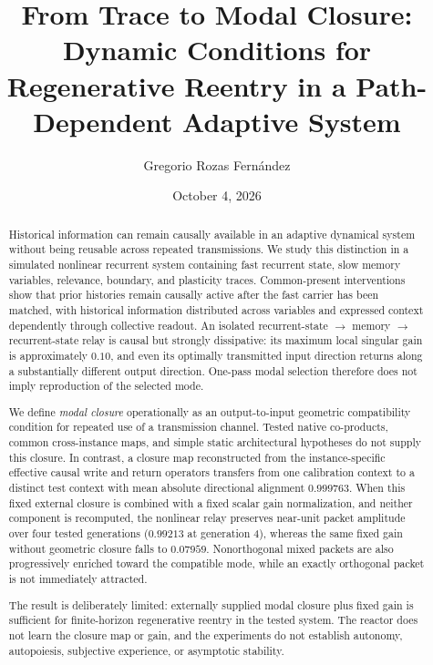 \documentclass[aps,pre,preprint,superscriptaddress,nofootinbib]{revtex4-2}
\begin{document}
\title{From Trace to Modal Closure: Dynamic Conditions for Regenerative Reentry in a Path-Dependent Adaptive System}
\author{Gregorio Rozas Fern\'andez}
\date{October 4, 2026}

\begin{abstract}
Historical information can remain causally available in an adaptive dynamical system without being reusable across repeated transmissions. We study this distinction in a simulated nonlinear recurrent system containing fast recurrent state, slow memory variables, relevance, boundary, and plasticity traces. Common-present interventions show that prior histories remain causally active after the fast carrier has been matched, with historical information distributed across variables and expressed context dependently through collective readout. An isolated recurrent-state $\rightarrow$ memory $\rightarrow$ recurrent-state relay is causal but strongly dissipative: its maximum local singular gain is approximately $0.10$, and even its optimally transmitted input direction returns along a substantially different output direction. One-pass modal selection therefore does not imply reproduction of the selected mode.

We define \emph{modal closure} operationally as an output-to-input geometric compatibility condition for repeated use of a transmission channel. Tested native co-products, common cross-instance maps, and simple static architectural hypotheses do not supply this closure. In contrast, a closure map reconstructed from the instance-specific effective causal write and return operators transfers from one calibration context to a distinct test context with mean absolute directional alignment $0.999763$. When this fixed external closure is combined with a fixed scalar gain normalization, and neither component is recomputed, the nonlinear relay preserves near-unit packet amplitude over four tested generations ($0.99213$ at generation 4), whereas the same fixed gain without geometric closure falls to $0.07959$. Nonorthogonal mixed packets are also progressively enriched toward the compatible mode, while an exactly orthogonal packet is not immediately attracted.

The result is deliberately limited: externally supplied modal closure plus fixed gain is sufficient for finite-horizon regenerative reentry in the tested system. The reactor does not learn the closure map or gain, and the experiments do not establish autonomy, autopoiesis, subjective experience, or asymptotic stability.
\end{abstract}
\end{document}
